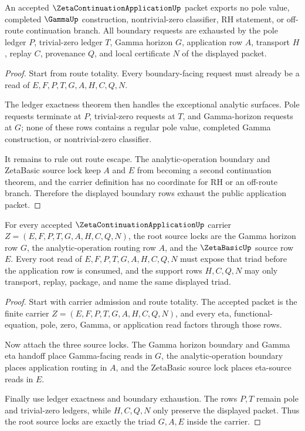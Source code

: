 \begin{theorem}
\label{thm:zeta-continuation-application-boundary-exhaustion}
An accepted $\ZetaContinuationApplicationUp$ packet exports no pole value, completed $\GammaUp$ construction, nontrivial-zero classifier, RH statement, or off-route continuation branch. All boundary requests are exhausted by the pole ledger $P$, trivial-zero ledger $T$, Gamma horizon $G$, application row $A$, transport $H$, replay $C$, provenance $Q$, and local certificate $N$ of the displayed packet.
\end{theorem}
\begin{proof}
Start from route totality. Every boundary-facing request must already be a read of $E,F,P,T,G,A,H,C,Q,N$.

The ledger exactness theorem then handles the exceptional analytic surfaces. Pole requests terminate at $P$, trivial-zero requests at $T$, and Gamma-horizon requests at $G$; none of these rows contains a regular pole value, completed Gamma construction, or nontrivial-zero classifier.

It remains to rule out route escape. The analytic-operation boundary and ZetaBasic source lock keep $A$ and $E$ from becoming a second continuation theorem, and the carrier definition has no coordinate for RH or an off-route branch. Therefore the displayed boundary rows exhaust the public application packet.
\end{proof}

\begin{theorem}
\label{thm:zeta-continuation-application-root-boundary-triad}
For every accepted $\ZetaContinuationApplicationUp$ carrier $Z=(E,F,P,T,G,A,H,C,Q,N)$, the root source locks are the Gamma horizon row $G$, the analytic-operation routing row $A$, and the $\ZetaBasicUp$ source row $E$. Every root read of $E,F,P,T,G,A,H,C,Q,N$ must expose that triad before the application row is consumed, and the support rows $H,C,Q,N$ may only transport, replay, package, and name the same displayed triad.
\end{theorem}
\begin{proof}
Start with carrier admission and route totality. The accepted packet is the finite carrier $Z=(E,F,P,T,G,A,H,C,Q,N)$, and every eta, functional-equation, pole, zero, Gamma, or application read factors through those rows.

Now attach the three source locks. The Gamma horizon boundary and Gamma eta handoff place Gamma-facing reads in $G$, the analytic-operation boundary places application routing in $A$, and the ZetaBasic source lock places eta-source reads in $E$.

Finally use ledger exactness and boundary exhaustion. The rows $P,T$ remain pole and trivial-zero ledgers, while $H,C,Q,N$ only preserve the displayed packet. Thus the root source locks are exactly the triad $G,A,E$ inside the carrier.
\end{proof}

